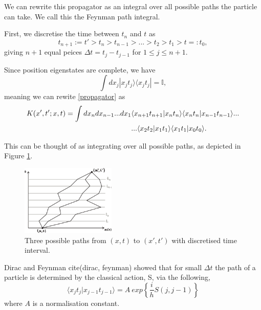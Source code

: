 \documentclass[11pt, a4paper]{article}
\theoremstyle{definition}
\theoremstyle{plain}
\begin{document}
We can rewrite this propagator as an integral over all 
possible paths the particle can take. We call this the 
Feynman path integral.

First, we discretise the time between $t_n$ and $t$ as
\[ t_{n+1} := t'>t_{n}>t_{n-1}>...>t_2>t_1>t =: t_0 ,\]
giving $n+1$ equal peices $\Delta t = t_j-t_{j-1}$ for 
$1 \leq j \leq n+1$.

Since position eigenstates are complete, we have
\begin{equation} 
\int dx_j |x_jt_j \rangle \langle x_jt_j | = \mathbb{I},
\end{equation}
meaning we can rewite \eqref{propagator} as
\begin{align} 
K(x',t';x,t) =
\int dx_{n}dx_{n-1}...dx_1 
&\langle x_{n+1}t_{n+1}|x_{n}t_{n} \rangle
\langle x_{n}t_{n}|x_{n-1}t_{n-1} \rangle
... \notag \\
&...\langle x_{2}t_{2}|x_{1}t_{1} \rangle
\langle x_{1}t_{1}|x_{0}t_{0} \rangle .
\label{pathint}
\end{align}

This can be thought of as integrating over all possible 
paths, as depicted in Figure \ref{figpaths}.

\begin{figure}[h!]
\centering
\includegraphics[width=0.4\textwidth]{paths.jpeg}
\captionsetup{width=0.6\textwidth}
\caption{Three possible paths from $(x,t)$ to $(x',t')$ with discretised time interval.}
\label{figpaths}
\end{figure}

Dirac and Feynman cite(dirac, feynman) showed that for 
small $\Delta t$ the path of a particle is determined 
by the classical action, S, via the following,
\begin{equation}
\langle x_jt_j | x_{j-1}t_{j-1} \rangle
=
A \ exp \left\{\frac{i}{h}S(j,j-1)\right\}
\label{pathofsmall}
\end{equation}
where $A$ is a normalisation constant.
\end{document}
